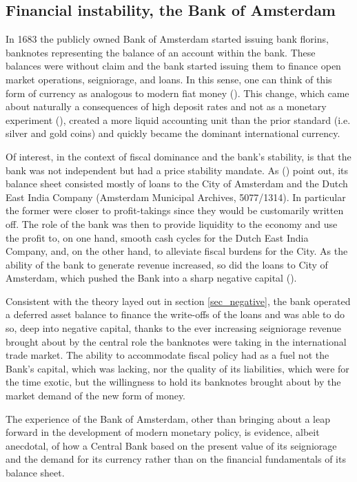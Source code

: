 \documentclass[american]{scrartcl}
\newcommand{\citein}[1]{\citeauthor{#1} (\citeyear{#1})}
\begin{document}
\subsection{Financial instability, the Bank of Amsterdam}

In 1683 the publicly owned Bank of Amsterdam started issuing bank florins, banknotes representing the balance of an account within the bank. These balances were without claim and the bank started issuing them to finance open market operations, seigniorage, and loans. In this sense, one can think of this form of currency as analogous to modern fiat money (\cite[p. 3]{Quinn2014}). This change, which came about naturally a consequences of high deposit rates and not as a monetary experiment (\cite[p. 3]{Quinn2014}), created a more liquid accounting unit than the prior standard (i.e. silver and gold coins) and quickly became the dominant international currency.

Of interest, in the context of fiscal dominance and the bank's stability, is that the bank was not independent but had a price stability mandate. As \citein{Quinn2014} point out, its balance sheet consisted mostly of loans to the City of Amsterdam and the Dutch East India Company (Amsterdam Municipal Archives, 5077/1314). In particular the former were closer to profit-takings since they would be customarily written off. The role of the bank was then to provide liquidity to the economy and use the profit to, on one hand, smooth cash cycles for the Dutch East India Company, and, on the other hand, to alleviate fiscal burdens for the City. As the ability of the bank to generate revenue increased, so did the loans to City of Amsterdam, which pushed the Bank into a sharp negative capital (\cite[p. 5]{Quinn2014}).

Consistent with the theory layed out in section \ref{sec_negative}, the bank operated a deferred asset balance to finance the write-offs of the loans and was able to do so, deep into negative capital, thanks to the ever increasing seigniorage revenue brought about by the central role the banknotes were taking in the international trade market. The ability to accommodate fiscal policy had as a fuel not the Bank's capital, which was lacking, nor the quality of its liabilities, which were for the time exotic, but the willingness to hold its banknotes brought about by the market demand of the new form of money.

The experience of the Bank of Amsterdam, other than bringing about a leap forward in the development of modern monetary policy, is evidence, albeit anecdotal, of how a Central Bank based on the present value of its seigniorage and the demand for its currency rather than on the financial fundamentals of its balance sheet.
\end{document}
